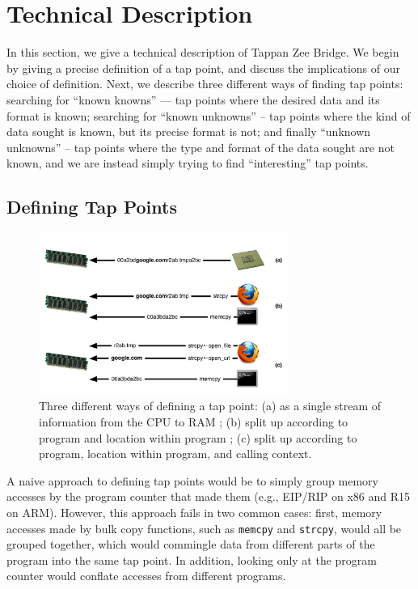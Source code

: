 \section{Technical Description}
\label{sec:technical}

In this section, we give a technical description of Tappan Zee Bridge.
We begin by giving a precise definition of a tap point, and discuss the
implications of our choice of definition. Next, we describe three
different ways of finding tap points: searching for ``known knowns'' ---
tap points where the desired data and its format is known; searching for
``known unknowns'' -- tap points where the kind of data sought is known,
but its precise format is not; and finally ``unknown unknowns'' -- tap
points where the type and format of the data sought are not known, and
we are instead simply trying to find ``interesting'' tap points.

\subsection{Defining Tap Points}

\begin{figure}[t]
\begin{center}
\includegraphics[width=3.2in]{tappoint.pdf}
\end{center}
\caption{Three different ways of defining a tap point: (a) as a single
stream of information from the CPU to RAM ; (b) split up according to
program and location within program ; (c) split up according to program,
location within program, and calling context.}
\label{fig:tappoint}
\end{figure}

A naive approach to defining tap points would be to simply group memory
accesses by the program counter that made them (e.g., EIP/RIP on x86 and
R15 on ARM). However, this approach fails in two common cases: first,
memory accesses made by bulk copy functions, such as \texttt{memcpy} and
\texttt{strcpy}, would all be grouped together, which would commingle
data from different parts of the program into the same tap point. In
addition, looking only at the program counter would conflate accesses
from different programs.

